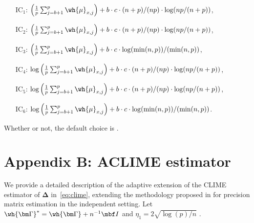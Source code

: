 \begin{itemize}
    \item[IC$_1$:] $ \left(\frac{1}{p} \sum _{j = b + 1}^p \wh{\mu}_{x, j} \right)
 + b \cdot c \cdot (n + p) / (n p) \cdot \log(n p / (n + p))$,
     \item[IC$_2$:] $ \left(\frac{1}{p} \sum _{j = b + 1}^p \wh{\mu}_{x, j} \right)
 + b \cdot c \cdot (n + p) / (n p) \cdot \log(n p / (n + p))$,
      \item[IC$_3$:] 	$ \left(\frac{1}{p} \sum _{j = b + 1}^p \wh{\mu}_{x, j} \right) 
 + b \cdot c \cdot \log(\min(n, p)) / (\min(n, p))$,
    \item[IC$_4$:] $ \log\left(\frac{1}{p} \sum _{j = b + 1}^p \wh{\mu}_{x, j} \right)
 + b \cdot c \cdot (n + p) / (n p) \cdot \log(n p / (n + p))$,
     \item[IC$_5$:] $ \log\left(\frac{1}{p} \sum _{j = b + 1}^p \wh{\mu}_{x, j} \right)
 + b \cdot c \cdot (n + p) / (n p) \cdot \log(n p / (n + p))$,
      \item[IC$_6$:] 	$ \log\left(\frac{1}{p} \sum _{j = b + 1}^p \wh{\mu}_{x, j} \right) 
 + b \cdot c \cdot \log(\min(n, p)) / (\min(n, p))$.
\end{itemize}
Whether  or not, the default choice is .
      
\section{Appendix B: ACLIME estimator}
\label{sec:aclime}

We provide a detailed description of the adaptive extension of the CLIME estimator of $\bm\Delta$ in~\eqref{eq:clime}, extending the methodology proposed in \cite{cai2016estimating} for precision matrix estimation in the independent setting.
Let $\wh{\bm\Gamma}^* = \wh{\bm\Gamma} + n^{-1}{\mbf I}$ and $\eta_1 = 2 \sqrt{{\log (p)} / {n}}$ .

